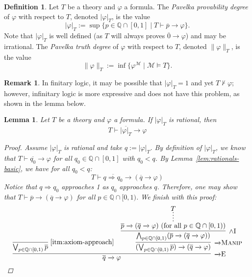 \documentclass{amsart}
\newtheorem{lemma}[theorem]{Lemma}
\theoremstyle{definition}
\newtheorem{remark}[theorem]{Remark}
\newtheorem{definition}[theorem]{Definition}
\numberwithin{equation}{theorem}
\renewcommand{\phi}{\varphi}
\newcommand{\Q}{\mathbb{Q}}
\newcommand{\where}{\mid}
\newcommand{\unwedge}{{\wedge}}
\newcommand{\proves}{\vdash}
\newcommand{\rat}[1]{{\overline{#1}}}
\newcommand{\narrow}[1]{\xrightarrow{#1}}
\renewcommand{\to}{\narrow{}}
\newcommand{\arr}{{\to}}
\newcommand{\intro}{\!\operatorname{I}}
\newcommand{\elim}{\!\operatorname{E}}
\newcommand{\aref}[1]{\!\text{\ref{itm:axiom-#1}}}
\newcommand{\pushdown}{\arr\text{\sc{Manip}}}
\begin{document}
\begin{definition}\label{def:proof-degree}
  Let $T$ be a theory and $\phi$ a formula.
  The \emph{Pavelka provability degree} of $\phi$ with respect to $T$, denoted $|\phi|_T$, is the value
  \[
    |\phi|_T:=\sup\{p\in\Q\cap[0,1]\where T\proves\rat p\to\phi\}.
  \]
  Note that $|\phi|_T$ is well defined (as $T$ will always proves $\rat 0\to\phi$) and may be irrational.
  The \emph{Pavelka truth degree} of $\phi$ with respect to $T$, denoted $\|\phi\|_T$, is the value
  \[
    \|\phi\|_T:=\inf\{\phi^\mathcal M\where \mathcal M\models T\}.
  \]
\end{definition}
\begin{remark}
In finitary logic, it may be possible that $|\phi|_T=1$ and yet $T\not\proves\phi$;
however, infinitary logic is more expressive and does not have this problem, as shown in the lemma below.
\end{remark}
\begin{lemma}\label{lem:approach}
  Let $T$ be a theory and $\phi$ a formula.
  If $|\phi|_T$ is rational, then
  \[
    T\proves\rat{|\phi|_T}\to\phi
  \]
  \begin{proof}
    Assume $|\phi|_T$ is rational and take $q:=|\phi|_T$.
    By definition of $|\phi|_T$, we know that $T\proves\rat{q_0}\to\phi$ for all $q_0\in\Q\cap[0,1]$ with $q_0<q$.
    By Lemma~\ref{lem:rationals-basic}, we have for all $q_0<q$:
    \[
      T\proves\rat{q\Rightarrow q_0}\to(\rat q\to\phi)
    \]
    Notice that $q\Rightarrow q_0$ approaches 1 as $q_0$ approaches $q$.
    Therefore, one may show that $T\proves\rat p\to(\rat q\to\phi)$ for all $p\in\Q\cap[0,1)$.
    We finish with this proof:
    \[
      \infer[\arr\elim]{\rat q\to\phi}{
        \infer[\aref{approach}]{\bigvee_{p\in\Q\cap[0,1)}\rat p}{} &
        \infer[\pushdown]{(\bigvee_{p\in\Q\cap[0,1)}\rat p)\to(\rat q\to\phi)}{
          \infer[\unwedge\intro]{\bigwedge_{p\in\Q\cap[0,1)}(\rat p\to(\rat q\to\phi))}{
            \infer*{\rat p\to(\rat q\to\phi)\text{ (for all $p\in\Q\cap[0,1)$)}}{T}
          }
        }
      }\qedhere
    \]
  \end{proof}
\end{lemma}
\end{document}
